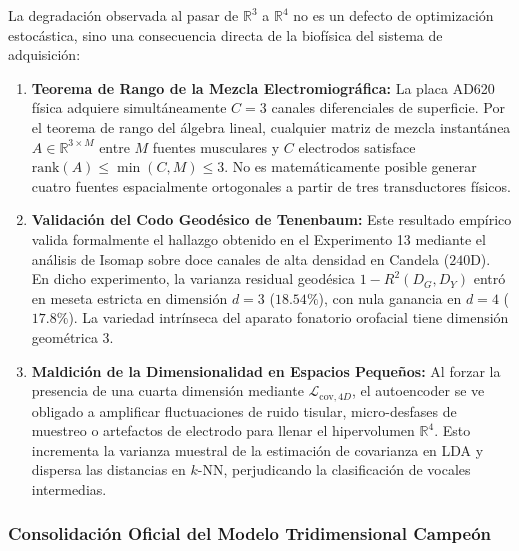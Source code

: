 \documentclass[11pt,a4paper,openany]{book}
\theoremstyle{definition}
\begin{document}
La degradación observada al pasar de $\mathbb{R}^3$ a $\mathbb{R}^4$ no es un defecto de optimización estocástica, sino una consecuencia directa de la biofísica del sistema de adquisición:
\begin{enumerate}
    \item \textbf{Teorema de Rango de la Mezcla Electromiográfica:} La placa AD620 física adquiere simultáneamente $C = 3$ canales diferenciales de superficie. Por el teorema de rango del álgebra lineal, cualquier matriz de mezcla instantánea $A \in \mathbb{R}^{3 \times M}$ entre $M$ fuentes musculares y $C$ electrodos satisface $\text{rank}(A) \le \min(C, M) \le 3$. No es matemáticamente posible generar cuatro fuentes espacialmente ortogonales a partir de tres transductores físicos.
    \item \textbf{Validación del Codo Geodésico de Tenenbaum:} Este resultado empírico valida formalmente el hallazgo obtenido en el Experimento 13 mediante el análisis de Isomap sobre doce canales de alta densidad en Candela ($240\text{D}$). En dicho experimento, la varianza residual geodésica $1 - R^2(D_G, D_Y)$ entró en meseta estricta en dimensión $d = 3$ ($18.54\%$), con nula ganancia en $d = 4$ ($17.8\%$). La variedad intrínseca del aparato fonatorio orofacial tiene dimensión geométrica 3.
    \item \textbf{Maldición de la Dimensionalidad en Espacios Pequeños:} Al forzar la presencia de una cuarta dimensión mediante $\mathcal{L}_{\text{cov}, 4D}$, el autoencoder se ve obligado a amplificar fluctuaciones de ruido tisular, micro-desfases de muestreo o artefactos de electrodo para llenar el hipervolumen $\mathbb{R}^4$. Esto incrementa la varianza muestral de la estimación de covarianza en LDA y dispersa las distancias en $k$-NN, perjudicando la clasificación de vocales intermedias.
\end{enumerate}

\subsubsection{Consolidación Oficial del Modelo Tridimensional Campeón}
\end{document}
